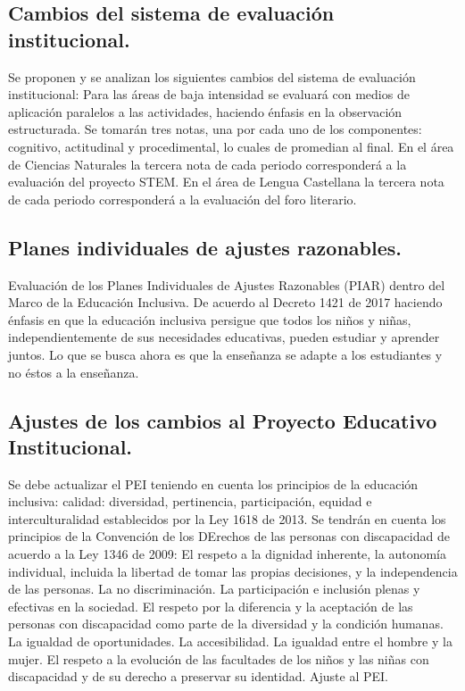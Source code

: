 \documentclass[12pt, letterpaper]{article} %
\begin{document}
    \subsection{Cambios del sistema de evaluación institucional.}Se proponen y se analizan los siguientes cambios del sistema de evaluación institucional:
Para las áreas de baja intensidad se evaluará con medios de aplicación paralelos a las actividades, haciendo énfasis en la observación estructurada. Se tomarán tres notas, una por cada uno de los componentes: cognitivo, actitudinal y procedimental, lo cuales de promedian al final.
En el área de Ciencias Naturales la tercera nota de cada periodo corresponderá a la evaluación del proyecto STEM.
En el área de Lengua Castellana la tercera nota de cada periodo corresponderá a la evaluación del foro literario.
    \subsection{Planes individuales de ajustes razonables.}Evaluación de los Planes Individuales de Ajustes Razonables (PIAR) dentro del Marco de la Educación Inclusiva. De acuerdo al Decreto 1421 de 2017 haciendo énfasis en que la educación inclusiva persigue que todos los niños y niñas, independientemente de sus necesidades educativas, pueden estudiar y aprender juntos. Lo que se busca ahora es que la enseñanza se adapte a los estudiantes y no éstos a la enseñanza.
    \subsection{Ajustes de los cambios al Proyecto Educativo Institucional.}Se debe actualizar el PEI teniendo en cuenta los principios de la educación inclusiva: calidad: diversidad, pertinencia, participación, equidad e interculturalidad establecidos por la Ley 1618 de 2013. Se tendrán en cuenta los principios de la Convención de los DErechos de las personas con discapacidad de acuerdo a la Ley 1346 de 2009:
El respeto a la dignidad inherente, la autonomía individual, incluida la libertad de tomar las propias decisiones, y la independencia de las personas.
La no discriminación.
La participación e inclusión plenas y efectivas en la sociedad.
El respeto por la diferencia y la aceptación de las personas con discapacidad como parte de la diversidad y la condición humanas.
La igualdad de oportunidades.
La accesibilidad.
La igualdad entre el hombre y la mujer.
El respeto a la evolución de las facultades de los niños y las niñas con discapacidad y de su derecho a preservar su identidad.
Ajuste al PEI. 
\end{document}
